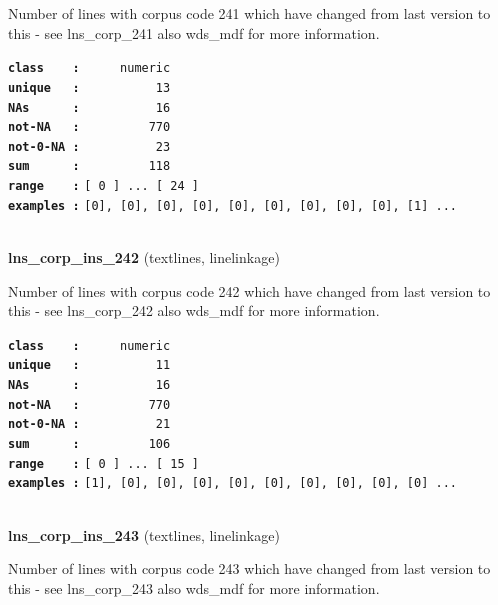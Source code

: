\documentclass[]{article}
\begin{document}
Number of lines with corpus code 241 which have changed from last
version to this - see lns\_corp\_241 also wds\_mdf for more information.

\textbf{\texttt{class\ \ \ \ :}} \texttt{~~~~~numeric}\\
\textbf{\texttt{unique\ \ \ :}} \texttt{~~~~~~~~~~13}\\
\textbf{\texttt{NAs\ \ \ \ \ \ :}} \texttt{~~~~~~~~~~16}\\
\textbf{\texttt{not-NA\ \ \ :}} \texttt{~~~~~~~~~770}\\
\textbf{\texttt{not-0-NA\ :}} \texttt{~~~~~~~~~~23}\\
\textbf{\texttt{sum\ \ \ \ \ \ :}} \texttt{~~~~~~~~~118}\\
\textbf{\texttt{range\ \ \ \ :}}
\texttt{{[}\ 0\ {]}\ ...\ {[}\ 24\ {]}}\\
\textbf{\texttt{examples\ :}}
\texttt{{[}0{]},\ {[}0{]},\ {[}0{]},\ {[}0{]},\ {[}0{]},\ {[}0{]},\ {[}0{]},\ {[}0{]},\ {[}0{]},\ {[}1{]}\ ...}\\

~

\textbf{lns\_corp\_ins\_242} (textlines, linelinkage)

Number of lines with corpus code 242 which have changed from last
version to this - see lns\_corp\_242 also wds\_mdf for more information.

\textbf{\texttt{class\ \ \ \ :}} \texttt{~~~~~numeric}\\
\textbf{\texttt{unique\ \ \ :}} \texttt{~~~~~~~~~~11}\\
\textbf{\texttt{NAs\ \ \ \ \ \ :}} \texttt{~~~~~~~~~~16}\\
\textbf{\texttt{not-NA\ \ \ :}} \texttt{~~~~~~~~~770}\\
\textbf{\texttt{not-0-NA\ :}} \texttt{~~~~~~~~~~21}\\
\textbf{\texttt{sum\ \ \ \ \ \ :}} \texttt{~~~~~~~~~106}\\
\textbf{\texttt{range\ \ \ \ :}}
\texttt{{[}\ 0\ {]}\ ...\ {[}\ 15\ {]}}\\
\textbf{\texttt{examples\ :}}
\texttt{{[}1{]},\ {[}0{]},\ {[}0{]},\ {[}0{]},\ {[}0{]},\ {[}0{]},\ {[}0{]},\ {[}0{]},\ {[}0{]},\ {[}0{]}\ ...}\\

~

\textbf{lns\_corp\_ins\_243} (textlines, linelinkage)

Number of lines with corpus code 243 which have changed from last
version to this - see lns\_corp\_243 also wds\_mdf for more information.
\end{document}
